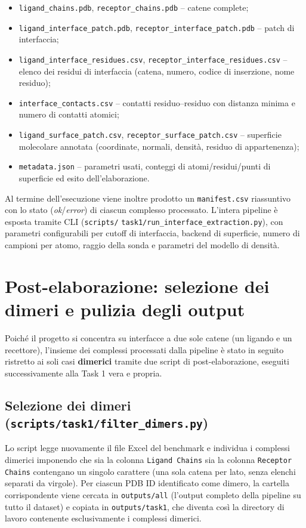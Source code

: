 \documentclass[11pt,a4paper]{article}
\begin{document}
\begin{itemize}
    \item \texttt{ligand\_chains.pdb}, \texttt{receptor\_chains.pdb} -- catene complete;
    \item \texttt{ligand\_interface\_patch.pdb}, \texttt{receptor\_interface\_patch.pdb} -- patch di interfaccia;
    \item \texttt{ligand\_interface\_residues.csv}, \texttt{receptor\_interface\_residues.csv} -- elenco dei residui di interfaccia (catena, numero, codice di inserzione, nome residuo);
    \item \texttt{interface\_contacts.csv} -- contatti residuo--residuo con distanza minima e numero di contatti atomici;
    \item \texttt{ligand\_surface\_patch.csv}, \texttt{receptor\_surface\_patch.csv} -- superficie molecolare annotata (coordinate, normali, densità, residuo di appartenenza);
    \item \texttt{metadata.json} -- parametri usati, conteggi di atomi/residui/punti di superficie ed esito dell'elaborazione.
\end{itemize}

Al termine dell'esecuzione viene inoltre prodotto un \texttt{manifest.csv} riassuntivo con lo stato (\emph{ok}/\emph{error}) di ciascun complesso processato. L'intera pipeline è esposta tramite CLI (\texttt{scripts/} \texttt{task1/run\_interface\_extraction.py}), con parametri configurabili per cutoff di interfaccia, backend di superficie, numero di campioni per atomo, raggio della sonda e parametri del modello di densità.

\section{Post-elaborazione: selezione dei dimeri e pulizia degli output}
\label{sec:postproc}
Poiché il progetto si concentra su interfacce a due sole catene (un ligando e un recettore), l'insieme dei complessi processati dalla pipeline è stato in seguito ristretto ai soli casi \textbf{dimerici} tramite due script di post-elaborazione, eseguiti successivamente alla Task 1 vera e propria.

\subsection{Selezione dei dimeri (\texttt{scripts/task1/filter\_dimers.py})}
Lo script legge nuovamente il file Excel del benchmark e individua i complessi dimerici imponendo che sia la colonna \texttt{Ligand Chains} sia la colonna \texttt{Receptor Chains} contengano un singolo carattere (una sola catena per lato, senza elenchi separati da virgole). Per ciascun PDB ID identificato come dimero, la cartella corrispondente viene cercata in \texttt{outputs/all} (l'output completo della pipeline su tutto il dataset) e copiata in \texttt{outputs/task1}, che diventa così la directory di lavoro contenente esclusivamente i complessi dimerici.
\end{document}
